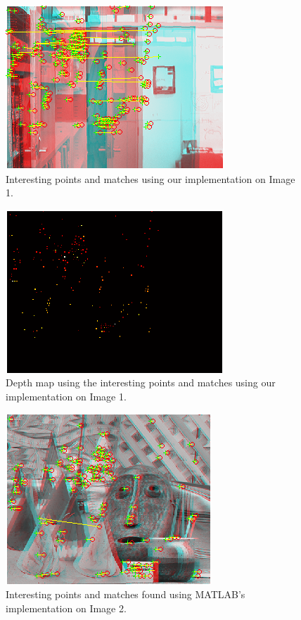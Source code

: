 \begin{figure}[H]\centering
	\includegraphics[width=0.8\linewidth]{Images/01_our_match.png}
	\caption{Interesting points and matches using our implementation on Image 1.}
	\label{fig:jp-ofc-ours-match}
\end{figure}

\begin{figure}[H]\centering
	\includegraphics[width=0.8\linewidth]{Images/01_our_depth.png}
	\caption{Depth map using the interesting points and matches using our implementation on Image 1.}
	\label{fig:jp-ofc-ours-depth}
\end{figure}

\begin{figure}[H]\centering
	\includegraphics[width=0.8\linewidth]{Images/02_matlab_match.png}
	\caption{Interesting points and matches found using MATLAB's implementation on Image 2.}
	\label{fig:grid-example}
\end{figure}

